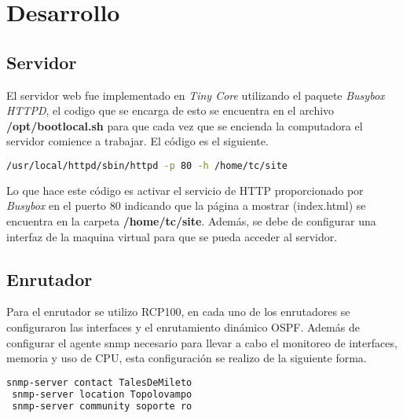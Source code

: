 \documentclass[a4paper,12pt]{article}
\begin{document}
\section{Desarrollo}
\subsection{Servidor}
El servidor web fue implementado en \emph{Tiny Core} utilizando el paquete \emph{Busybox HTTPD}, el codigo que se encarga de esto se encuentra en el archivo \textbf{/opt/bootlocal.sh} para que cada vez que se encienda la computadora el servidor comience a trabajar. El código es el siguiente.

\begin{lstlisting}[language=bash]
 /usr/local/httpd/sbin/httpd -p 80 -h /home/tc/site
\end{lstlisting}
Lo que hace este código es activar el servicio de HTTP proporcionado por \emph{Busybox} en el puerto 80 indicando que la página a mostrar (index.html) se encuentra en la carpeta \textbf{/home/tc/site}.
Además, se debe de configurar una interfaz de la maquina virtual para que se pueda acceder al servidor.
\subsection{Enrutador}
Para el enrutador se utilizo RCP100, en cada uno de los enrutadores se configuraron las interfaces y el enrutamiento dinámico OSPF. Además de configurar el agente snmp necesario para llevar a cabo el monitoreo de interfaces, memoria y uso de CPU, esta configuración se realizo de la siguiente forma.
\begin{lstlisting}[language=bash]
 snmp-server contact TalesDeMileto
 snmp-server location Topolovampo
 snmp-server community soporte ro
\end{lstlisting}
\end{document}

